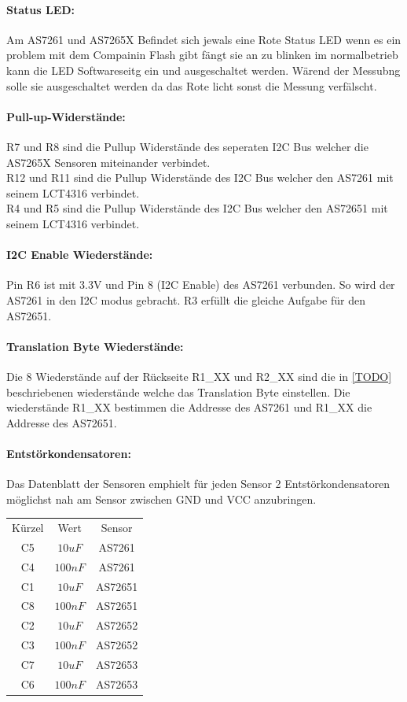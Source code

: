 \paragraph{Status LED:} Am AS7261 und AS7265X Befindet sich jewals eine Rote Status LED wenn es ein problem mit dem Compainin Flash gibt fängt sie an zu blinken im normalbetrieb kann die LED Softwareseitg ein und ausgeschaltet werden.
	Wärend der Messubng solle sie ausgeschaltet werden da das Rote licht sonst die Messung verfälscht.

\paragraph{Pull-up-Widerstände:}
R7 und R8 sind die Pullup Widerstände des seperaten I2C Bus welcher die AS7265X Sensoren miteinander verbindet.\\
R12 und R11 sind die Pullup Widerstände des I2C Bus welcher den AS7261 mit seinem LCT4316 verbindet.\\
R4 und R5 sind die Pullup Widerstände des I2C Bus welcher den AS72651 mit seinem LCT4316 verbindet.

\paragraph{I2C Enable Wiederstände:} Pin R6 ist mit 3.3V und Pin 8 (I2C Enable) des AS7261 verbunden. So wird der AS7261 in den I2C modus gebracht.
	R3 erfüllt die gleiche Aufgabe für den AS72651.
	
\paragraph{Translation Byte Wiederstände:}
Die 8 Wiederstände auf der Rückseite R1\_XX und R2\_XX sind die in \ref{TODO} beschriebenen wiederstände welche das Translation Byte einstellen. Die wiederstände R1\_XX bestimmen die Addresse des AS7261 und R1\_XX die Addresse des AS72651.

\paragraph{Entstörkondensatoren:} Das Datenblatt der Sensoren emphielt für jeden Sensor 2 Entstörkondensatoren möglichst nah am Sensor zwischen GND und VCC anzubringen.


\begin{center}
\begin{tabular}{ c c c }
 Kürzel & Wert & Sensor \\ 
 C5 & $10uF$ & AS7261 \\  
 C4 & $100nF$ & AS7261 \\
 C1 & $10uF$ & AS72651 \\  
 C8 & $100nF$ & AS72651 \\
 C2 & $10uF$ & AS72652 \\  
 C3 & $100nF$ & AS72652 \\
 C7 & $10uF$ & AS72653 \\  
 C6 & $100nF$ & AS72653 \\
\end{tabular}
\end{center}


